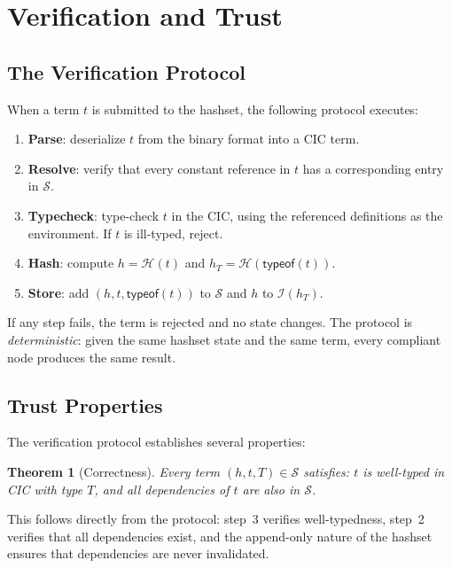 \documentclass[11pt]{article}
\theoremstyle{definition}
\theoremstyle{plain}
\newtheorem{theorem}{Theorem}[section]
\theoremstyle{remark}
\newcommand{\hash}{\mathcal{H}}
\newcommand{\hashset}{\mathcal{S}}
\newcommand{\typeindex}{\mathcal{I}}
\begin{document}
\section{Verification and Trust}
\label{sec:trust}

\subsection{The Verification Protocol}
\label{sec:protocol}

When a term $t$ is submitted to the hashset, the following protocol executes:

\begin{enumerate}[nosep]
  \item \textbf{Parse}: deserialize $t$ from the binary format into a CIC term.
  \item \textbf{Resolve}: verify that every constant reference in $t$ has a corresponding entry in $\hashset$.
  \item \textbf{Typecheck}: type-check $t$ in the CIC, using the referenced definitions as the environment.
    If $t$ is ill-typed, reject.
  \item \textbf{Hash}: compute $h = \hash(t)$ and $h_T = \hash(\textsf{typeof}(t))$.
  \item \textbf{Store}: add $(h, t, \textsf{typeof}(t))$ to $\hashset$ and $h$ to $\typeindex(h_T)$.
\end{enumerate}

If any step fails, the term is rejected and no state changes.
The protocol is \emph{deterministic}: given the same hashset state and the same term, every
compliant node produces the same result.

\subsection{Trust Properties}
\label{sec:trust-properties}

The verification protocol establishes several properties:

\begin{theorem}[Correctness]
\label{thm:correctness}
Every term $(h, t, T) \in \hashset$ satisfies: $t$ is well-typed in CIC with type $T$,
and all dependencies of $t$ are also in $\hashset$.
\end{theorem}

This follows directly from the protocol: step~3 verifies well-typedness, step~2 verifies
that all dependencies exist, and the append-only nature of the hashset ensures that
dependencies are never invalidated.
\end{document}
